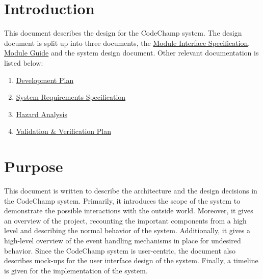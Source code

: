 \documentclass[12pt, titlepage]{article}
\begin{document}
\newpage

\tableofcontents

\newpage

\listoftables

\listoffigures

\newpage


\section{Introduction}
This document describes the design for the CodeChamp system. The design document is split up into three documents, the \href{https://github.com/Tamas-Leung/CodeChamp/tree/main/docs/Design/MIS}{Module Interface Specification}, \href{https://github.com/Tamas-Leung/CodeChamp/tree/main/docs/Design/MG}{Module Guide} and the system design document. Other relevant documentation is listed below:
\begin{enumerate}
    \item \href{https://github.com/Tamas-Leung/CodeChamp/tree/main/docs/DevelopmentPlan}{Development Plan}
    \item \href{https://github.com/Tamas-Leung/CodeChamp/tree/main/docs/SRS}{System Requirements Specification} 
    \item \href{https://github.com/Tamas-Leung/CodeChamp/blob/main/docs/HazardAnalysis/HazardAnalysis.md}{Hazard Analysis}
    \item \href{https://github.com/Tamas-Leung/CodeChamp/blob/main/docs/VnVPlan}{Validation \& Verification Plan} 
    
\end{enumerate}

\section{Purpose}

This document is written to describe the architecture and the design decisions in the CodeChamp system. Primarily, it introduces the scope of the system to demonstrate the possible interactions with the outside world. Moreover, it gives an overview of the project, recounting the important components from a high level and describing the normal behavior of the system. Additionally, it gives a high-level overview of the event handling mechanisms in place for undesired behavior. Since the CodeChamp system is user-centric, the document also describes mock-ups for the user interface design of the system. Finally, a timeline is given for the implementation of the system. 
\end{document}
